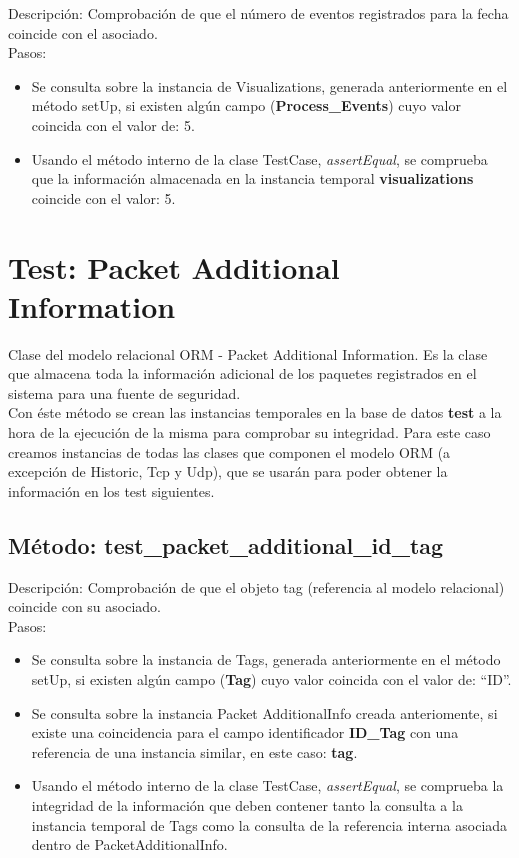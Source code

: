Descripción: Comprobación de que el número de eventos registrados para la fecha coincide con el asociado.\\
Pasos:
\begin{itemize}
\item Se consulta sobre la instancia de Visualizations, generada anteriormente en el método setUp, si existen algún campo (\textbf{Process\_Events}) cuyo valor coincida con el valor de: 5.
\item Usando el método interno de la clase TestCase, \emph{assertEqual}, se comprueba que la información almacenada en la instancia temporal \textbf{visualizations} coincide con el valor: 5.
\end{itemize}



\section{\quad Test: Packet Additional Information}

Clase del modelo relacional ORM - Packet Additional Information. Es la clase que almacena toda la información adicional de los paquetes registrados en el sistema para una fuente de seguridad.\\

Con éste método se crean las instancias temporales en la base de datos \textbf{test} a la hora de la ejecución de la misma para comprobar su integridad. Para este caso creamos instancias de todas las clases que componen el modelo ORM (a excepción de Historic, Tcp y Udp), que se usarán para poder obtener la información en los test siguientes.\\



\subsection{\quad Método: test\_packet\_additional\_id\_tag}

Descripción: Comprobación de que el objeto tag (referencia al modelo relacional) coincide con su asociado.\\
Pasos:
\begin{itemize}
\item Se consulta sobre la instancia de Tags, generada anteriormente en el método setUp, si existen algún campo (\textbf{Tag}) cuyo valor coincida con el valor de: ``ID''.
\item Se consulta sobre la instancia Packet AdditionalInfo creada anteriomente, si existe una coincidencia para el campo identificador \textbf{ID\_Tag} con una referencia de una instancia similar, en este caso: \textbf{tag}.
\item Usando el método interno de la clase TestCase, \emph{assertEqual}, se comprueba la integridad de la información que deben contener tanto la consulta a la instancia temporal de Tags como la consulta de la referencia interna asociada dentro de PacketAdditionalInfo.
\end{itemize}

